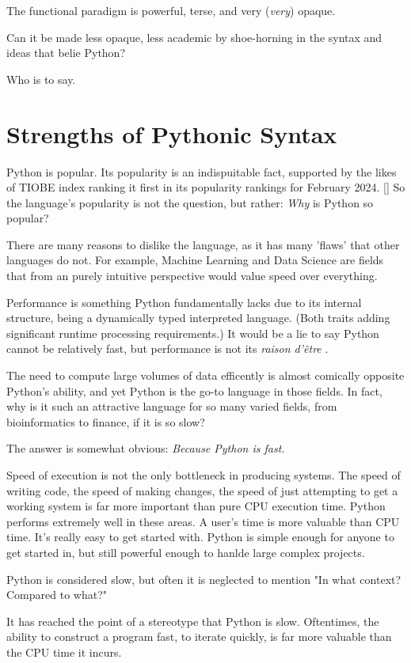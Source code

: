 \documentclass{l4proj}
\begin{document}
The functional paradigm is powerful, terse, and very (\emph{very}) opaque.

Can it be made less opaque, less academic by shoe-horning in the syntax and ideas that belie Python?

Who is to say.

\section{Strengths of Pythonic Syntax}

Python is popular.
Its popularity is an indispuitable fact, supported by the likes of TIOBE index ranking it first in its popularity rankings for February 2024. [\cite{TIOBE}]
So the language's popularity is not the question, but rather: \emph{Why} is Python so popular? 

There are many reasons to dislike the language, as it has many 'flaws' that other languages do not.
For example, Machine Learning and Data Science are fields that from an purely intuitive perspective would value speed over everything.

Performance is something Python fundamentally lacks due to its internal structure, being a dynamically typed interpreted language. (Both traits adding significant runtime processing requirements.)
It would be a lie to say Python cannot be relatively fast, but performance is not its \emph{raison d'être
}.


The need to compute large volumes of data efficently is almost comically opposite Python's ability, and yet Python is the go-to language in those fields.
In fact, why is it such an attractive language for so many varied fields, from bioinformatics to finance, if it is so slow?

The answer is somewhat obvious: \emph{Because Python is fast.}

Speed of execution is not the only bottleneck in producing systems.
The speed of writing code, the speed of making changes, the speed of just attempting to get a working system is far more important than pure CPU execution time.
Python performs extremely well in these areas.
A user's time is more valuable than CPU time.
It's really easy to get started with.
Python is simple enough for anyone to get started in, but still powerful enough to hanlde large complex projects.

Python is considered slow, but often it is neglected to mention "In what context? Compared to what?"

It has reached the point of a stereotype that Python is slow.
Oftentimes, the ability to construct a program fast, to iterate quickly, is far more valuable than the CPU time it incurs.
\end{document}
